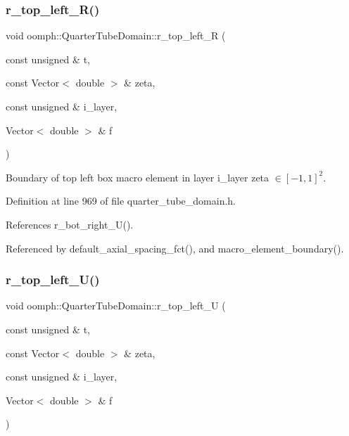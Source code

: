 \mbox{\label{classoomph_1_1QuarterTubeDomain_a1aded600b61798fbc080189fadd1c603}} 
\subsubsection{\texorpdfstring{r\+\_\+top\+\_\+left\+\_\+\+R()}{r\_top\_left\_R()}}
{\footnotesize\ttfamily void oomph\+::\+Quarter\+Tube\+Domain\+::r\+\_\+top\+\_\+left\+\_\+R (\begin{DoxyParamCaption}\item[{const unsigned \&}]{t,  }\item[{const Vector$<$ double $>$ \&}]{zeta,  }\item[{const unsigned \&}]{i\+\_\+layer,  }\item[{Vector$<$ double $>$ \&}]{f }\end{DoxyParamCaption})\hspace{0.3cm}{\ttfamily [private]}}



Boundary of top left box macro element in layer i\+\_\+layer zeta $ \in [-1,1]^2 $. 



Definition at line 969 of file quarter\+\_\+tube\+\_\+domain.\+h.



References r\+\_\+bot\+\_\+right\+\_\+\+U().



Referenced by default\+\_\+axial\+\_\+spacing\+\_\+fct(), and macro\+\_\+element\+\_\+boundary().

\mbox{\label{classoomph_1_1QuarterTubeDomain_ac1cda2361ed175bdf52032dce05f4365}} 
\subsubsection{\texorpdfstring{r\+\_\+top\+\_\+left\+\_\+\+U()}{r\_top\_left\_U()}}
{\footnotesize\ttfamily void oomph\+::\+Quarter\+Tube\+Domain\+::r\+\_\+top\+\_\+left\+\_\+U (\begin{DoxyParamCaption}\item[{const unsigned \&}]{t,  }\item[{const Vector$<$ double $>$ \&}]{zeta,  }\item[{const unsigned \&}]{i\+\_\+layer,  }\item[{Vector$<$ double $>$ \&}]{f }\end{DoxyParamCaption})\hspace{0.3cm}{\ttfamily [private]}}



